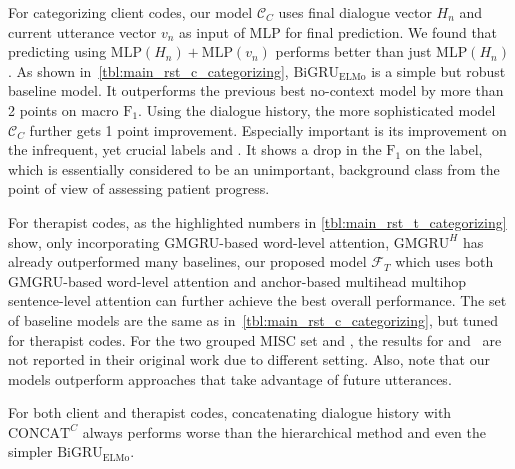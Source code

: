 

For categorizing client codes, our model $\mathcal{C}_C$ uses final
dialogue vector $H_{n}$ and current utterance vector $v_{n}$ as input
of MLP for final prediction. We found that predicting using
$\text{MLP}(H_{n})+\text{MLP}(v_{n})$ performs better than just
$\text{MLP}({H_{n}})$.  As shown
in~\autoref{tbl:main_rst_c_categorizing}, $\text{BiGRU}_{\text{ELMo}}$
is a simple but robust baseline model. It outperforms the previous
best no-context model by more than 2 points on macro
$\text{F}_{1}$. Using the dialogue history, the more sophisticated
model $\mathcal{C}_{C}$ further gets 1 point improvement. Especially
important is its improvement on the infrequent, yet crucial labels
\CHANGE and \SUSTAIN. It shows a drop in the $\text{F}_{1}$ on the \FN
label, which is essentially considered to be an unimportant,
background class from the point of view of assessing patient progress.
%

For therapist codes, as the highlighted numbers in
\autoref{tbl:main_rst_t_categorizing} show, only incorporating
GMGRU-based word-level attention, $\text{GMGRU}^{H}$ has already
outperformed many baselines, our proposed model $\mathcal{F}_{T}$
which uses both GMGRU-based word-level attention and anchor-based
multihead multihop sentence-level attention can further achieve the
best overall performance. The set of baseline models are the same as
in~\autoref{tbl:main_rst_c_categorizing}, but tuned for therapist
codes. For the two grouped MISC set \MIA and \MIN, the results for
\citet{can2015dialog} and~\citet{tanana2016comparison} are not
reported in their original work due to different setting. Also, note
that our models outperform approaches that take advantage of future
utterances.

For both client and therapist codes, concatenating dialogue history
with $\text{CONCAT}^{C}$ always performs worse than the hierarchical
method and even the simpler $\text{BiGRU}_{\text{ELMo}}$.


